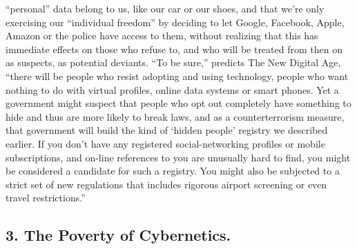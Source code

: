 \documentclass[landscape,twocolumn,letterpaper]{article}
\begin{document}
“personal” data belong to us, like our car or our shoes, and that
we’re only exercising our “individual freedom” by deciding to let
Google, Facebook, Apple, Amazon or the police have access to them,
without realizing that this has immediate effects on those who refuse
to, and who will be treated from then on as suspects, as potential
deviants. “To be sure,” predicts The New Digital Age, “there will be
people who resist adopting and using technology, people who want
nothing to do with virtual profiles, online data systems or smart
phones. Yet a government might suspect that people who opt out
completely have something to hide and thus are more likely to break
laws, and as a counterterrorism measure, that government will build
the kind of ‘hidden people’ registry we described earlier. If you
don’t have any registered social-networking profiles or mobile
subscriptions, and on-line references to you are unusually hard to
find, you might be considered a candidate for such a registry. You
might also be subjected to a strict set of new regulations that
includes rigorous airport screening or even travel restrictions.”

\subsection*{3. The Poverty of Cybernetics.}
\end{document}
